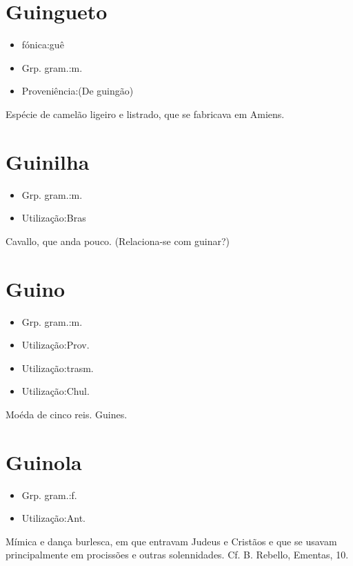 \section{Guingueto}
\begin{itemize}
\item {fónica:guê}
\end{itemize}
\begin{itemize}
\item {Grp. gram.:m.}
\end{itemize}
\begin{itemize}
\item {Proveniência:(De \textunderscore guingão\textunderscore )}
\end{itemize}
Espécie de camelão ligeiro e listrado, que se fabricava em Amiens.
\section{Guinilha}
\begin{itemize}
\item {Grp. gram.:m.}
\end{itemize}
\begin{itemize}
\item {Utilização:Bras}
\end{itemize}
Cavallo, que anda pouco.
(Relaciona-se com \textunderscore guinar\textunderscore ?)
\section{Guino}
\begin{itemize}
\item {Grp. gram.:m.}
\end{itemize}
\begin{itemize}
\item {Utilização:Prov.}
\end{itemize}
\begin{itemize}
\item {Utilização:trasm.}
\end{itemize}
\begin{itemize}
\item {Utilização:Chul.}
\end{itemize}
Moéda de cinco reis.
Guines.
\section{Guinola}
\begin{itemize}
\item {Grp. gram.:f.}
\end{itemize}
\begin{itemize}
\item {Utilização:Ant.}
\end{itemize}
Mímica e dança burlesca, em que entravam Judeus e Cristãos e que se usavam principalmente em procissões e outras solennidades. Cf. B. Rebello, \textunderscore Ementas\textunderscore , 10.
